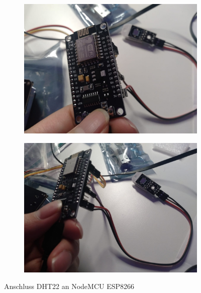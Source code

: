 \documentclass[draft=false
              ,paper=a4
              ,twoside=false
              ,fontsize=10pt
              ,headsepline
              ,BCOR10mm
              ,DIV11
              ]{article}
\begin{document}
\begin{figure}[h!]
  \centering
  \begin{subfigure}[b]{0.48\linewidth}
    \includegraphics[width=\linewidth]{verkabelung_dht22_1}
  \end{subfigure}
  \begin{subfigure}[b]{0.48\linewidth}
    \includegraphics[width=\linewidth]{verkabelung_dht22_2}
  \end{subfigure}
  \caption{Anschluss DHT22 an NodeMCU ESP8266}
  \label{fig:dht22anNodeMCU}
\end{figure}
\end{document}
